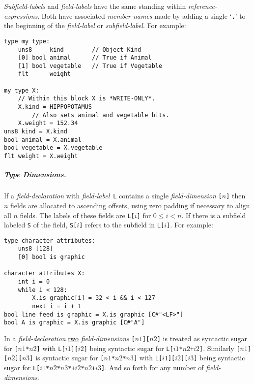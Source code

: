 \documentclass[12pt]{article}
\newcommand{\subsubsubsubsection}[1]{\subparagraph[#1]{#1.}}
\newcommand{\TT}[1]{{\tt \bfseries #1}}
\newenvironment{indpar}[1][0.3in]%
	{\begin{list}{}%
		     {\setlength{\itemsep}{0in}%
		      \setlength{\topsep}{0in}%
		      \setlength{\parsep}{1ex}%
		      \setlength{\labelwidth}{#1}%
		      \setlength{\leftmargin}{#1}%
		      \addtolength{\leftmargin}{\labelsep}}%
	 \item}%
	{\end{list}}
\begin{document}
{\em Subfield-labels} and {\em field-labels} have the same standing within
{\em reference-expressions}.
Both have associated {\em member-names} made by adding a single
`\TT{.}' to the beginning of the {\em field-label} or {\em subfield-label}.
For example:

\begin{indpar}\begin{verbatim}
type my type:
    uns8     kind        // Object Kind
    [0] bool animal      // True if Animal
    [1] bool vegetable   // True if Vegetable
    flt      weight

my type X:
    // Within this block X is *WRITE-ONLY*.
    X.kind = HIPPOPOTAMUS
        // Also sets animal and vegetable bits.
    X.weight = 152.34
uns8 kind = X.kind
bool animal = X.animal
bool vegetable = X.vegetable
flt weight = X.weight
\end{verbatim}\end{indpar}

\subsubsubsubsection{Type Dimensions}

If a {\em field-declaration} with {\em field-label}\, {\tt L} contains 
a single {\em field-dimension} {\tt [$n$]} then $n$ fields are
allocated to ascending offsets, using zero padding
if necessary to align all $n$ fields.  The labels of these
fields are {\tt L[$i$]} for $0\le i<n$.  If there is a subfield
labeled {\tt S} of the field, {\tt S[$i$]} refers to the
subfield in {\tt L[$i$]}.  For example:

\begin{indpar}\begin{verbatim}
type character attributes:
    uns8 [128]
    [0] bool is graphic

character attributes X:
    int i = 0
    while i < 128:
        X.is graphic[i] = 32 < i && i < 127
        next i = i + 1
bool line feed is graphic = X.is graphic [C#"<LF>"]
bool A is graphic = X.is graphic [C#"A"]
\end{verbatim}\end{indpar}

In a {\em field-declaration}
\underline{two} {\em field-dimensions} {\tt [$n1$][$n2$]} is
treated as syntactic sugar for {\tt [$n1$*$n2$]} with
{\tt L[$i1$][$i2$]} being syntactic sugar for
{\tt L[$i1$*$n2$+$i2$]}.  Similarly
{\tt [$n1$][$n2$][$n3$]} is
syntactic sugar for {\tt [$n1$*$n2$*$n3$]} with
{\tt L[$i1$][$i2$][$i3$]} being syntactic sugar for
{\tt L[$i1$*$n2$*$n3$*+$i2$*$n2$+$i3$]}.  And so forth for any
number of {\em field-dimensions}.
\end{document}
